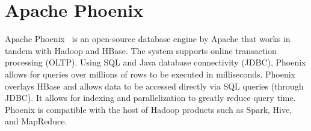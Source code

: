 \section{Apache Phoenix}

Apache Phoenix~\cite{hid-sp18-www-526-apache-phoenix} 
is an open-source database engine by Apache that works 
in tandem with Hadoop and HBase. The system supports online 
transaction processing (OLTP). Using SQL and Java database 
connectivity (JDBC), Phoenix allows for queries over millions of rows 
to be executed in milliseconds. Phoenix overlays HBase and allows 
data to be accessed directly via SQL queries (through JDBC). It allows
for indexing and parallelization to greatly reduce query time. Phoenix
is compatible with the host of Hadoop products such as Spark, Hive, 
and MapReduce.

